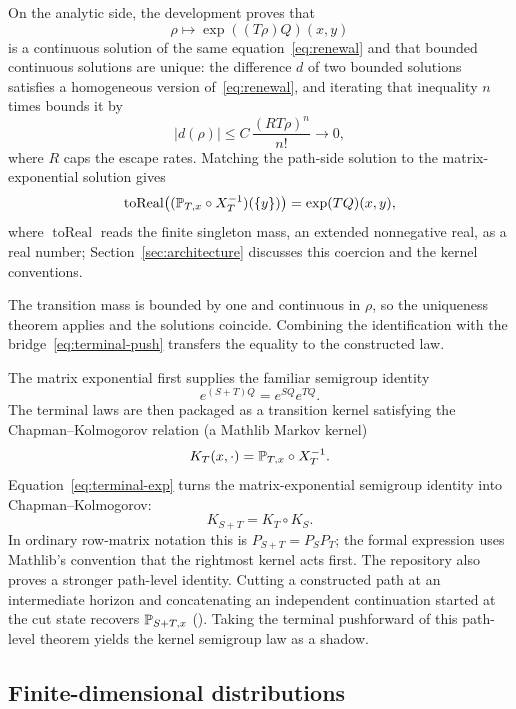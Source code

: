 On the analytic side, the development proves that
\[
  \rho\longmapsto \exp((T\rho)Q)(x,y)
\]
is a continuous solution of the same equation~\eqref{eq:renewal} and that bounded continuous solutions are unique: the difference $d$ of two bounded solutions satisfies a homogeneous version of~\eqref{eq:renewal}, and iterating that inequality $n$ times bounds it by
\[
  \lvert d(\rho)\rvert \le C\,\frac{(RT\rho)^n}{n!}
  \longrightarrow 0,
\]
where $R$ caps the escape rates. Matching the path-side solution to the matrix-exponential solution gives
\begin{equation}
\label{eq:terminal-exp}
  \operatorname{toReal}\bigl((\mathbb{P}_{T,x}\circ X_T^{-1})(\{y\})\bigr)
  = \exp(TQ)(x,y),
\end{equation}
where $\operatorname{toReal}$ reads the finite singleton mass, an extended nonnegative real, as a real number; Section~\ref{sec:architecture} discusses this coercion and the kernel conventions.

The transition mass is bounded by one and continuous in $\rho$, so the uniqueness theorem applies and the solutions coincide. Combining the identification with the bridge~\eqref{eq:terminal-push} transfers the equality to the constructed law.

The matrix exponential first supplies the familiar semigroup identity
\[
  e^{(S+T)Q}=e^{SQ}e^{TQ}.
\]
The terminal laws are then packaged as a transition kernel satisfying the Chapman--Kolmogorov relation (a Mathlib Markov kernel)
\[
  K_T(x,\cdot)=\mathbb{P}_{T,x}\circ X_T^{-1}.
\]
Equation~\eqref{eq:terminal-exp} turns the matrix-exponential semigroup identity into Chapman--Kolmogorov:
\[
  K_{S+T}=K_T\circ K_S.
\]
In ordinary row-matrix notation this is $P_{S+T}=P_SP_T$; the formal expression uses Mathlib's convention that the rightmost kernel acts first.
The repository also proves a stronger path-level identity. Cutting a constructed path at an intermediate horizon and concatenating an independent continuation started at the cut state recovers $\mathbb{P}_{S+T,x}$ (). Taking the terminal pushforward of this path-level theorem yields the kernel semigroup law as a shadow.

\subsection{Finite-dimensional distributions}

